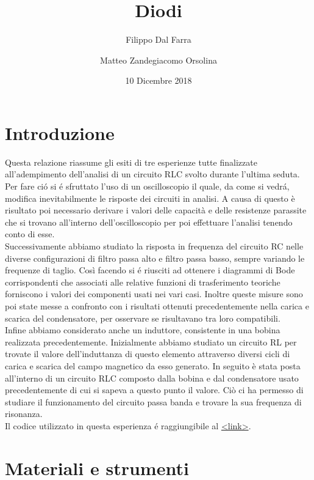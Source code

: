 \documentclass{article}
\title{Diodi}
\author{Filippo Dal Farra \and Matteo Zandegiacomo Orsolina}
\date{10 Dicembre 2018}
\begin{document}
\maketitle

\newpage

\section{Introduzione}

Questa relazione riassume gli esiti di tre esperienze tutte finalizzate all'adempimento dell'analisi di un circuito RLC svolto durante l'ultima seduta. Per fare ci\'o si \'e sfruttato l'uso di un oscilloscopio il quale, da come si vedr\'a, modifica inevitabilmente le risposte dei circuiti in analisi. A causa di questo è risultato poi necessario derivare i valori delle capacità e delle resistenze parassite che si trovano all'interno dell'oscilloscopio per poi effettuare l'analisi tenendo conto di esse. \\

Successivamente abbiamo studiato la risposta in frequenza del circuito RC nelle diverse configurazioni di filtro passa alto e filtro passa basso, sempre variando le frequenze di taglio. Così facendo si \'e riusciti ad ottenere i diagrammi di Bode corrispondenti che associati alle relative funzioni di trasferimento teoriche forniscono i valori dei componenti usati nei vari casi. Inoltre queste misure sono poi state messe a confronto con i risultati ottenuti precedentemente nella carica e scarica del condensatore, per osservare se risultavano tra loro compatibili. \\

Infine abbiamo considerato anche un induttore, consistente in una bobina realizzata precedentemente. Inizialmente abbiamo studiato un circuito RL per trovate il valore dell'induttanza di questo elemento attraverso diversi cicli di carica e scarica del campo magnetico da esso generato. In seguito è stata posta all'interno di un circuito RLC composto dalla bobina e dal condensatore usato precedentemente di cui si sapeva a questo punto il valore. Ciò ci ha permesso di studiare il funzionamento del circuito passa banda e trovare la sua frequenza di risonanza. \\

Il codice utilizzato in questa esperienza \'e raggiungibile al \href{https://gitlab.com/volpx/lab-2/tree/master/Exp234}{<link>}.

\newpage

\section{Materiali e strumenti}
\end{document}

